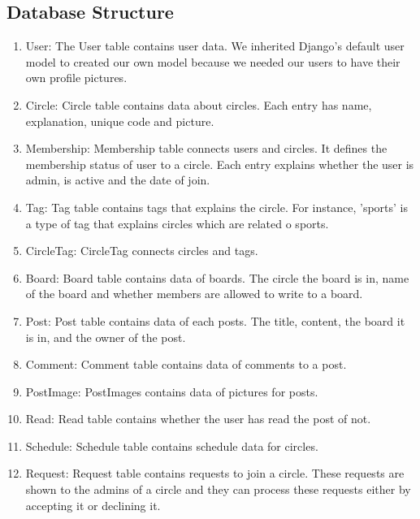 \documentclass[conference]{IEEEtran}
\begin{document}
\subsection{Database Structure}
\begin{enumerate}
    \item User: The User table contains user data. We inherited Django's default user model to created our own model because we needed our users to have their own profile pictures.
    \item Circle:  Circle table contains data about circles. Each entry has name, explanation, unique code and picture.
    \item Membership: Membership table connects users and circles. It defines the membership status of user to a circle. Each entry explains whether the user is admin, is active and the date of join.
    \item Tag: Tag table contains tags that explains the circle. For instance, 'sports' is a type of tag that explains circles which are related o sports.
    \item CircleTag: CircleTag connects circles and tags.
    \item Board: Board table contains data of boards. The circle the board is in, name of the board and whether members are allowed to write to a board.
    \item Post: Post table contains data of each posts. The title, content, the board it is in, and the owner of the post.
    \item Comment: Comment table contains data of comments to a post.
    \item PostImage: PostImages contains data of pictures for posts. 
    \item Read: Read table contains whether the user has read the post of not.
    \item Schedule: Schedule table contains schedule data for circles.
    \item Request: Request table contains requests to join a circle. These requests are shown to the admins of a circle and they can process these requests either by accepting it or declining it.
\end{enumerate}
\end{document}
